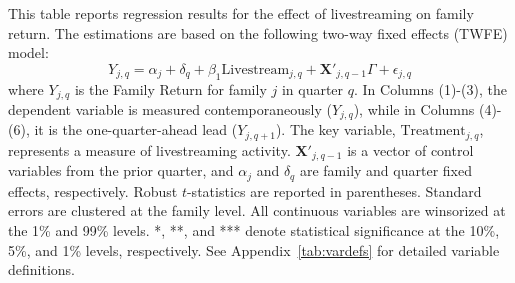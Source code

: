 \begin{table}[!ht]
    \centering
    
    \caption{Dynamic Livestream Effect on Family Return}\label{tab:family_twfe_return_reallocation}
    
    \begin{minipage}{0.95\textwidth}
        \footnotesize
        This table reports regression results for the effect of livestreaming on family return. The estimations are based on the following two-way fixed effects (TWFE) model:
        \begin{equation*}
            Y_{j,q} = \alpha_j + \delta_q + \beta_1 \text{Livestream}_{j,q} + \mathbf{X}'_{j,q-1} \Gamma + \epsilon_{j,q}
        \end{equation*}
        where $Y_{j,q}$ is the Family Return for family $j$ in quarter $q$. In Columns (1)-(3), the dependent variable is measured contemporaneously ($Y_{j,q}$), while in Columns (4)-(6), it is the one-quarter-ahead lead ($Y_{j,q+1}$). The key variable, $\text{Treatment}_{j,q}$, represents a measure of livestreaming activity. $\mathbf{X}'_{j,q-1}$ is a vector of control variables from the prior quarter, and $\alpha_j$ and $\delta_q$ are family and quarter fixed effects, respectively. Robust $t$-statistics are reported in parentheses. Standard errors are clustered at the family level. All continuous variables are winsorized at the 1\% and 99\% levels. *, **, and *** denote statistical significance at the 10\%, 5\%, and 1\% levels, respectively. See Appendix~\ref{tab:vardefs} for detailed variable definitions. %
    \end{minipage}

    \vspace{2mm}

     
    
\end{table}